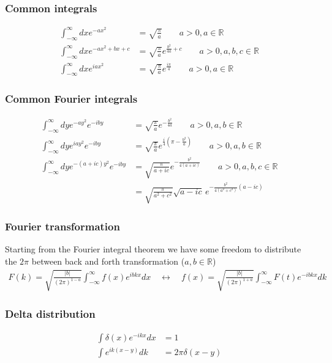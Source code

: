 \documentclass[10pt,a4paper]{article}
\theoremstyle{definition}
\begin{document}
\subsubsection{Common integrals}
\begin{align}
    \int_{-\infty}^\infty dx e^{-ax^2}&=\sqrt{\frac{\pi}{a}} \qquad a>0, a\in\mathbb{R}\\
    \int_{-\infty}^\infty dx e^{-ax^2+bx+c}&=\sqrt{\frac{\pi}{a}}e^{\frac{b^2}{4a}+c} \qquad a>0, a,b,c\in\mathbb{R}\\
    \int_{-\infty}^\infty dx e^{iax^2}&=\sqrt{\frac{\pi}{a}}e^{\frac{i\pi}{4}} \qquad a>0, a\in\mathbb{R}
\end{align}
\subsubsection{Common Fourier integrals}
\begin{align}
    \int_{-\infty}^\infty dy e^{-ay^2}e^{-iby}&=\sqrt{\frac{\pi}{a}}e^{-\frac{b^2}{4a}} \qquad a>0, a,b\in\mathbb{R}\\
    \int_{-\infty}^\infty dy e^{iay^2}e^{-iby}&=\sqrt{\frac{\pi}{a}}e^{\frac{i}{4}\left(\pi-\frac{b^2}{a}\right)} \qquad a>0, a,b\in\mathbb{R}\\
    \int_{-\infty}^\infty dy e^{-(a+ic)y^2}e^{-iby}&=\sqrt{\frac{\pi}{a+ic}}e^{-\frac{b^2}{4(a+ic)}} \qquad a>0, a,b,c\in\mathbb{R}\\
    &=\sqrt{\frac{\pi}{a^2+c^2}}\sqrt{a-ic}\,e^{-\frac{b^2}{4(a^2+c^2)}(a-ic)}
\end{align}

\subsubsection{Fourier transformation}
Starting from the Fourier integral theorem we have some freedom to distribute the $2\pi$ between back and forth transformation ($a,b\in\mathbb{R}$)
\begin{align}
    F(k)=\sqrt{\frac{|b|}{(2\pi)^{1-a}}}\int_{-\infty}^\infty f(x)e^{ibkx}dx\quad\leftrightarrow\quad f(x)=\sqrt{\frac{|b|}{(2\pi)^{1+a}}}\int_{-\infty}^\infty F(t)e^{-ibkx}dk
\end{align}

\subsubsection{Delta distribution}
\begin{align}
    \int\delta(x)e^{-ikx}dx&=1\\
    \int e^{ik(x-y)}dk&=2\pi\delta(x-y)
\end{align}
\end{document}
